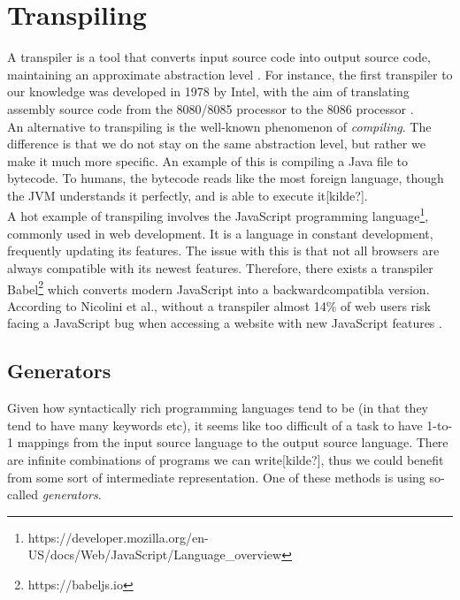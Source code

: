 \section{Transpiling}

A transpiler is a tool that converts input source code into output source code, maintaining an approximate abstraction level \cite{DBLP:conf/els/MarcelinoL22}. For instance, the first transpiler to our knowledge was developed in 1978 by Intel, with the aim of translating assembly source code from the 8080/8085 processor to the 8086 processor \cite{intel1979}. \hfill \\

An alternative to transpiling is the well-known phenomenon of \textit{compiling}. The difference is that we do not stay on the same abstraction level, but rather we make it much more specific. An example of this is compiling a Java file to bytecode. To humans, the bytecode reads like the most foreign language, though the JVM understands it perfectly, and is able to execute it[kilde?]. \hfill \\

A hot example of transpiling involves the JavaScript programming language\footnote{https://developer.mozilla.org/en-US/docs/Web/JavaScript/Language\_overview}, commonly used in web development. It is a language in constant development, frequently updating its features. The issue with this is that not all browsers are always compatible with its newest features. Therefore, there exists a transpiler Babel\footnote{https://babeljs.io} which converts modern JavaScript into a backwardcompatibla version. According to Nicolini et al., without a transpiler almost 14\% of web users risk facing a JavaScript bug when accessing a website with new JavaScript features \cite{DBLP:journals/software/NicoliniHF24}.

\subsection{Generators}

Given how syntactically rich programming languages tend to be (in that they tend to have many keywords etc), it seems like too difficult of a task to have 1-to-1 mappings from the input source language to the output source language. There are infinite combinations of programs we can write[kilde?], thus we could benefit from some sort of intermediate representation. One of these methods is using so-called \textit{generators}. \hfill \\

